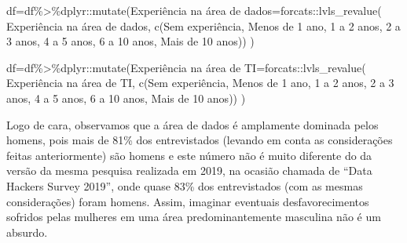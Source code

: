 \documentclass[
]{article}
\newenvironment{Shaded}{\begin{snugshade}}{\end{snugshade}}
\newcommand{\AttributeTok}[1]{\textcolor[rgb]{0.77,0.63,0.00}{#1}}
\newcommand{\FunctionTok}[1]{\textcolor[rgb]{0.00,0.00,0.00}{#1}}
\newcommand{\NormalTok}[1]{#1}
\newcommand{\OtherTok}[1]{\textcolor[rgb]{0.56,0.35,0.01}{#1}}
\newcommand{\SpecialCharTok}[1]{\textcolor[rgb]{0.00,0.00,0.00}{#1}}
\newcommand{\StringTok}[1]{\textcolor[rgb]{0.31,0.60,0.02}{#1}}
\begin{document}
\begin{Shaded}
\begin{Highlighting}[]
\NormalTok{df}\OtherTok{=}\NormalTok{df}\SpecialCharTok{\%\textgreater{}\%}\NormalTok{dplyr}\SpecialCharTok{::}\FunctionTok{mutate}\NormalTok{(}\StringTok{\textasciigrave{}}\AttributeTok{Experiência na área de dados}\StringTok{\textasciigrave{}}\OtherTok{=}\NormalTok{forcats}\SpecialCharTok{::}\FunctionTok{lvls\_revalue}\NormalTok{(}
  \StringTok{\textasciigrave{}}\AttributeTok{Experiência na área de dados}\StringTok{\textasciigrave{}}\NormalTok{, }\FunctionTok{c}\NormalTok{(}\StringTok{\textquotesingle{}Sem experiência\textquotesingle{}}\NormalTok{, }\StringTok{\textquotesingle{}Menos de 1 ano\textquotesingle{}}\NormalTok{,}
                                    \StringTok{\textquotesingle{}1 a 2 anos\textquotesingle{}}\NormalTok{, }\StringTok{\textquotesingle{}2 a 3 anos\textquotesingle{}}\NormalTok{, }\StringTok{\textquotesingle{}4 a 5 anos\textquotesingle{}}\NormalTok{,}
                                    \StringTok{\textquotesingle{}6 a 10 anos\textquotesingle{}}\NormalTok{, }\StringTok{\textquotesingle{}Mais de 10 anos\textquotesingle{}}\NormalTok{))}
\NormalTok{)}

\NormalTok{df}\OtherTok{=}\NormalTok{df}\SpecialCharTok{\%\textgreater{}\%}\NormalTok{dplyr}\SpecialCharTok{::}\FunctionTok{mutate}\NormalTok{(}\StringTok{\textasciigrave{}}\AttributeTok{Experiência na área de TI}\StringTok{\textasciigrave{}}\OtherTok{=}\NormalTok{forcats}\SpecialCharTok{::}\FunctionTok{lvls\_revalue}\NormalTok{(}
  \StringTok{\textasciigrave{}}\AttributeTok{Experiência na área de TI}\StringTok{\textasciigrave{}}\NormalTok{, }\FunctionTok{c}\NormalTok{(}\StringTok{\textquotesingle{}Sem experiência\textquotesingle{}}\NormalTok{, }\StringTok{\textquotesingle{}Menos de 1 ano\textquotesingle{}}\NormalTok{,}
                                    \StringTok{\textquotesingle{}1 a 2 anos\textquotesingle{}}\NormalTok{, }\StringTok{\textquotesingle{}2 a 3 anos\textquotesingle{}}\NormalTok{, }\StringTok{\textquotesingle{}4 a 5 anos\textquotesingle{}}\NormalTok{,}
                                    \StringTok{\textquotesingle{}6 a 10 anos\textquotesingle{}}\NormalTok{, }\StringTok{\textquotesingle{}Mais de 10 anos\textquotesingle{}}\NormalTok{))}
\NormalTok{)}
\end{Highlighting}
\end{Shaded}

Logo de cara, observamos que a área de dados é amplamente dominada pelos
homens, pois mais de 81\% dos entrevistados (levando em conta as
considerações feitas anteriormente) são homens e este número não é muito
diferente do da versão da mesma pesquisa realizada em 2019, na ocasião
chamada de ``Data Hackers Survey 2019'', onde quase 83\% dos
entrevistados (com as mesmas considerações) foram homens. Assim,
imaginar eventuais desfavorecimentos sofridos pelas mulheres em uma área
predominantemente masculina não é um absurdo.
\end{document}
